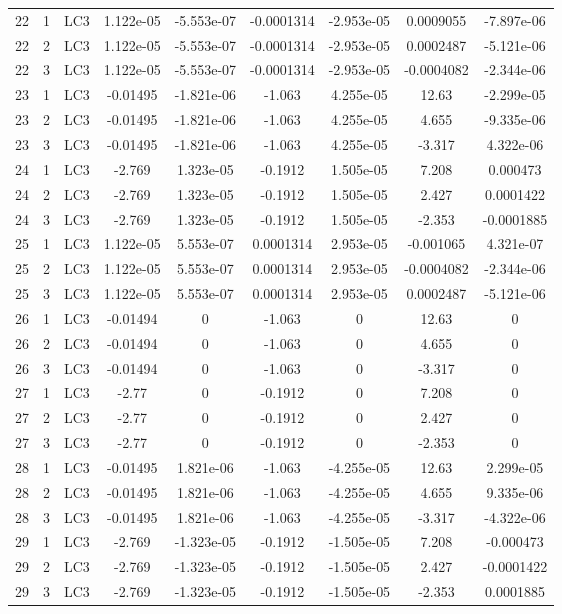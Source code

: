 \documentclass{article}%
\begin{document}
\begin{longtable}{| c c c | c c c c c c |}
22&1&LC3&1.122e{-}05&{-}5.553e{-}07&{-}0.0001314&{-}2.953e{-}05&0.0009055&{-}7.897e{-}06\\%
22&2&LC3&1.122e{-}05&{-}5.553e{-}07&{-}0.0001314&{-}2.953e{-}05&0.0002487&{-}5.121e{-}06\\%
22&3&LC3&1.122e{-}05&{-}5.553e{-}07&{-}0.0001314&{-}2.953e{-}05&{-}0.0004082&{-}2.344e{-}06\\%
23&1&LC3&{-}0.01495&{-}1.821e{-}06&{-}1.063&4.255e{-}05&12.63&{-}2.299e{-}05\\%
23&2&LC3&{-}0.01495&{-}1.821e{-}06&{-}1.063&4.255e{-}05&4.655&{-}9.335e{-}06\\%
23&3&LC3&{-}0.01495&{-}1.821e{-}06&{-}1.063&4.255e{-}05&{-}3.317&4.322e{-}06\\%
24&1&LC3&{-}2.769&1.323e{-}05&{-}0.1912&1.505e{-}05&7.208&0.000473\\%
24&2&LC3&{-}2.769&1.323e{-}05&{-}0.1912&1.505e{-}05&2.427&0.0001422\\%
24&3&LC3&{-}2.769&1.323e{-}05&{-}0.1912&1.505e{-}05&{-}2.353&{-}0.0001885\\%
25&1&LC3&1.122e{-}05&5.553e{-}07&0.0001314&2.953e{-}05&{-}0.001065&4.321e{-}07\\%
25&2&LC3&1.122e{-}05&5.553e{-}07&0.0001314&2.953e{-}05&{-}0.0004082&{-}2.344e{-}06\\%
25&3&LC3&1.122e{-}05&5.553e{-}07&0.0001314&2.953e{-}05&0.0002487&{-}5.121e{-}06\\%
26&1&LC3&{-}0.01494&0&{-}1.063&0&12.63&0\\%
26&2&LC3&{-}0.01494&0&{-}1.063&0&4.655&0\\%
26&3&LC3&{-}0.01494&0&{-}1.063&0&{-}3.317&0\\%
27&1&LC3&{-}2.77&0&{-}0.1912&0&7.208&0\\%
27&2&LC3&{-}2.77&0&{-}0.1912&0&2.427&0\\%
27&3&LC3&{-}2.77&0&{-}0.1912&0&{-}2.353&0\\%
28&1&LC3&{-}0.01495&1.821e{-}06&{-}1.063&{-}4.255e{-}05&12.63&2.299e{-}05\\%
28&2&LC3&{-}0.01495&1.821e{-}06&{-}1.063&{-}4.255e{-}05&4.655&9.335e{-}06\\%
28&3&LC3&{-}0.01495&1.821e{-}06&{-}1.063&{-}4.255e{-}05&{-}3.317&{-}4.322e{-}06\\%
29&1&LC3&{-}2.769&{-}1.323e{-}05&{-}0.1912&{-}1.505e{-}05&7.208&{-}0.000473\\%
29&2&LC3&{-}2.769&{-}1.323e{-}05&{-}0.1912&{-}1.505e{-}05&2.427&{-}0.0001422\\%
29&3&LC3&{-}2.769&{-}1.323e{-}05&{-}0.1912&{-}1.505e{-}05&{-}2.353&0.0001885\\%

\end{longtable}
\end{document}
